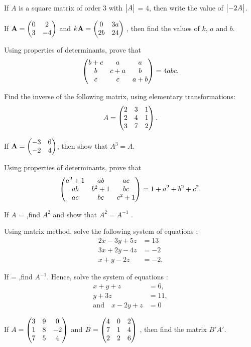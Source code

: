 \item If $A$ is a square matrix of order $3$ with   $\begin{vmatrix}A\end{vmatrix}$ = $4$, then write the value of $\begin{vmatrix}-2 A\end{vmatrix}$.

\item If $\mathbf{A}=\begin{pmatrix}0&2\\3&-4\end{pmatrix}$ and $ k \mathbf{A}=\begin{pmatrix}0&3a\\2b&24\end{pmatrix}$ , then find the values of $k$, $a$ and $b$.

\item Using properties of determinants, prove that 
\begin{align*}
    \begin{pmatrix}b+c & a & a\\b & c+a & b\\c & c & a+b\end{pmatrix}=4abc.
\end{align*}

\item Find the inverse of the following matrix, using elementary
transformations: 
\begin{align*}
    A=\begin{pmatrix}2 & 3 & 1\\2 & 4 & 1\\3 & 7 & 2\end{pmatrix}.
\end{align*}

\item If $\mathbf{A} = \begin{pmatrix}-3&6\\-2&4\end{pmatrix}$, then show that $A^3= A$.

\item Using properties of determinants, prove that
\begin{align*}
\begin{pmatrix}a^{2}+1&ab&ac\\ab&b^{2}+1&bc\\ac&bc&c^{2}+1\end{pmatrix} = 1+a^{2}+b^{2}+c^{2}.
\end{align*}
\item If $A$ =  ,find $A^{2}$ and show that $A^{2} = A^{-1}$ .

\item Using matrix method, solve the following system of equations :
\begin{align*}
    2x-3y+5z&=13\\
    3x+2y-4z &=-2\\
    x+y-2z&=-2.
\end{align*}

\item If  = ,find $A^{-1}$.
Hence, solve the system of equations :
\begin{align*}
    x+y+z&=6 ,\\
    y+3z&=11 ,\\
    \text  {and} \hspace{12pt}x-2y+z&= 0
\end{align*}

\item If $A = \begin{pmatrix}3&9&0\\1&8&-2\\7&5&4\end{pmatrix}$ and $B = \begin{pmatrix}4&0&2\\7&1&4\\2&2&6\end{pmatrix}$ , then find the matrix $B'A'$.

